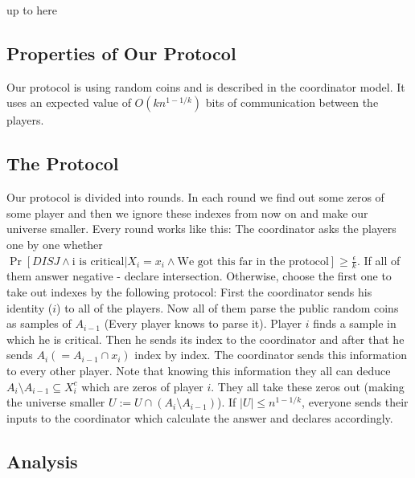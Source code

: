 \documentclass{article}
\newcommand{\TODO}[1]{ {\color{red} #1 }}
\theoremstyle{plain}
\begin{document}
\TODO{up to here}



\subsection{Properties of Our Protocol}
Our protocol is using random coins and is described in the coordinator model. It uses an expected value of $O(kn^{1-1/k})$ bits of communication between the players.
\subsection{The Protocol}
Our protocol is divided into rounds. In each round we find out some zeros of some player and then we ignore these indexes from now on and make our universe smaller. \newline
Every round works like this: \newline
The coordinator asks the players one by one whether $\Pr[DISJ \land \text{i is critical} | X_i = x_i \land \text{We got this far in the protocol}] \geq \frac{\epsilon}{k}$. \newline
If all of them answer negative - declare intersection. \newline
Otherwise, choose the first one to take out indexes by the following protocol: \newline
First the coordinator sends his identity ($i$) to all of the players. \newline
Now all of them parse the public random coins as samples of $A_{i-1}$ (Every player knows to parse it). Player $i$ finds a sample in which he is critical. Then he sends its index to the coordinator and after that he sends $A_i (=A_{i-1} \cap x_i)$ index by index. The coordinator sends this information to every other player.
Note that knowing this information they all can deduce $A_i \setminus A_{i-1} \subseteq X^{c}_i$ which are zeros of player $i$. They all take these zeros out (making the universe smaller $U := U \cap (A_i \setminus A_{i-1})$). If $|U| \leq n^{1-1/k}$, everyone sends their inputs to the coordinator which calculate the answer and declares accordingly.
\subsection{Analysis}
\end{document}
